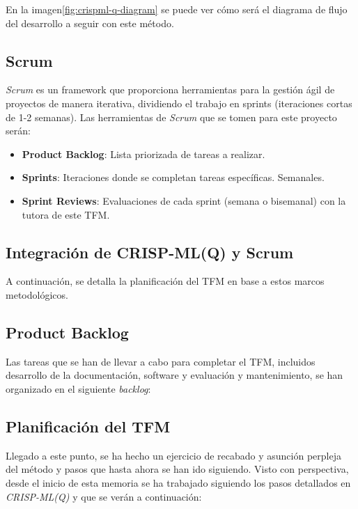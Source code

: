 En la imagen\ref{fig:crispml-q-diagram} se puede ver cómo será el diagrama de flujo del desarrollo a seguir con este método.

\subsection{Scrum}

\emph{Scrum} es un framework que proporciona herramientas para la gestión ágil de proyectos de manera iterativa, dividiendo el trabajo en sprints (iteraciones cortas de 1-2 semanas). Las herramientas de \emph{Scrum} que se tomen para este proyecto serán:

\begin{itemize}
    \item \textbf{Product Backlog}: Lista priorizada de tareas a realizar.
    \item \textbf{Sprints}: Iteraciones donde se completan tareas específicas. Semanales.
    \item \textbf{Sprint Reviews}: Evaluaciones de cada sprint (semana o bisemanal) con la tutora de este TFM.
\end{itemize}

\subsection{Integración de CRISP-ML(Q) y Scrum}

A continuación, se detalla la planificación del TFM en base a estos marcos metodológicos.

\subsection{Product Backlog}

Las tareas que se han de llevar a cabo para completar el TFM, incluidos desarrollo de la documentación, software y evaluación y mantenimiento, se han organizado en el siguiente \emph{backlog}:



\clearpage

\clearpage

\newpage

%


\subsection{Planificación del TFM}

Llegado a este punto, se ha hecho un ejercicio de recabado y asunción perpleja del método y pasos que hasta ahora se han ido siguiendo. Visto con perspectiva, desde el inicio de esta memoria se ha trabajado siguiendo los pasos detallados en \emph{CRISP-ML(Q)} y que se verán a continuación:

